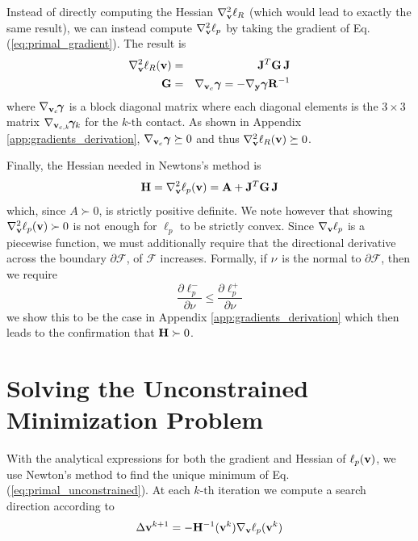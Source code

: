 Instead of directly computing the Hessian $\nabla_{\mathbf{v}}^2\ell_R$ (which would
lead to exactly the same result), we can instead compute $\nabla_{\mathbf{v}}^2\ell_p$
by taking the gradient of Eq. (\ref{eq:primal_gradient}). The result is
\begin{eqnarray}
	\nabla_\mf{v}^2\ell_R(\mf{v}) &=&
	\mf{J}^T\mf{G}\,\mf{J}\nonumber\\
	\mf{G} &=& \nabla_{\mf{v}_c}\bgamma = -\nabla_\mf{y}\bgamma \mf{R}^{-1}
	\label{eq:ellR_hessian}
\end{eqnarray}
where $\nabla_{{\mathbf{v}}_c}\!{\bm\gamma}$ is a block diagonal matrix where each
diagonal elements is the $3\times 3$ matrix
$\nabla_{{\mathbf{v}}_{c,k}}\!{\bm\gamma}_k$ for the $k\text{-th}$ contact. As shown in
Appendix \ref{app:gradients_derivation}, $\nabla_{{\mathbf{v}}_c}{\bm\gamma}\succeq 0$ and
thus $\nabla_{\mathbf{v}}^2\ell_R({\mathbf{v}})\succeq 0$.

Finally, the Hessian needed in Newtons's method is
\begin{equation}
	\mf{H}= \nabla_\mf{v}^2\ell_p(\mf{v}) = \mf{A} + \mf{J}^T\mf{G}\,\mf{J}
	\label{eq:ell_hessian}
\end{equation}
which, since $A\succ 0$, is strictly positive definite. We note however that
showing $\nabla_{\mathbf{v}}^2\ell_p({\mathbf{v}})\succ 0$ is not enough for $\ell_p$ to be
strictly convex. Since $\nabla_{\mathbf{v}}\ell_p$ is a piecewise function, we must
additionally require that the directional derivative across the boundary
$\partial\mathcal{F}$, of $\mathcal{F}$ increases. Formally, if ${\mathbf{\nu}}$ is
the normal to $\partial\mathcal{F}$, then we require
\begin{equation}
	\frac{\partial \ell_p^-}{\partial \nu} \le \frac{\partial \ell_p^+}{\partial \nu}
\end{equation}
we show this to be the case in Appendix \ref{app:gradients_derivation} which
then leads to the confirmation that ${\mathbf{H}}\succ 0$.


\section{Solving the Unconstrained Minimization Problem}
\label{sec:solver_details}

With the analytical expressions for both the gradient and Hessian of
$\ell_p({\mathbf{v}})$, we use Newton's method to find the unique minimum of Eq.
(\ref{eq:primal_unconstrained}). At each $k\text{-th}$ iteration we
compute a search direction according to
\begin{equation}
	\Delta\mf{v}^{k+1} = -\mf{H}^{-1}(\mf{v}^k)\nabla_\mf{v}\ell_p(\mf{v}^k)
	\label{eq:Newton_iteration}
\end{equation}

